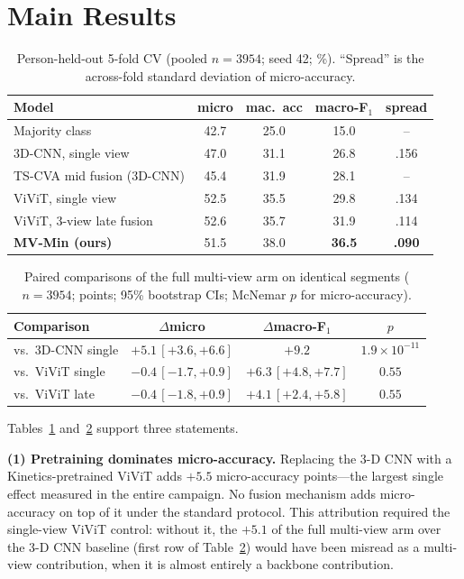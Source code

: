 \documentclass[journal]{IEEEtran}
\newcommand{\micro}{micro-accuracy}
\newcommand{\mF}{macro-F$_1$}
\newcommand{\mvmin}{MV-Min}
\begin{document}
\section{Main Results}
\label{sec:main}

\begin{table}[t]
\caption{Person-held-out 5-fold CV (pooled $n{=}3954$; seed 42; \%).
``Spread'' is the across-fold standard deviation of \micro.}
\label{tab:main}
\centering\footnotesize\setlength{\tabcolsep}{4pt}
\begin{tabular}{lcccc}
\toprule
Model & micro & mac.\ acc & \mF & spread \\
\midrule
Majority class            & 42.7 & 25.0 & 15.0 & --   \\
3D-CNN, single view       & 47.0 & 31.1 & 26.8 & .156 \\
TS-CVA mid fusion (3D-CNN)& 45.4 & 31.9 & 28.1 & --   \\
\midrule
ViViT, single view        & 52.5 & 35.5 & 29.8 & .134 \\
ViViT, 3-view late fusion & 52.6 & 35.7 & 31.9 & .114 \\
\textbf{\mvmin{} (ours)}  & 51.5 & 38.0 & \textbf{36.5} & \textbf{.090} \\
\bottomrule
\end{tabular}
\end{table}

\begin{table}[t]
\caption{Paired comparisons of the full multi-view arm on identical
segments ($n{=}3954$; points; 95\% bootstrap CIs; McNemar $p$ for \micro).}
\label{tab:paired}
\centering\footnotesize\setlength{\tabcolsep}{2.5pt}
\begin{tabular}{lccc}
\toprule
Comparison & $\Delta$micro & $\Delta$\mF & $p$ \\
\midrule
vs.\ 3D-CNN single & $+5.1\,[+3.6,+6.6]$ & $+9.2$ & $1.9{\times}10^{-11}$ \\
vs.\ ViViT single  & $-0.4\,[-1.7,+0.9]$ & $+6.3\,[+4.8,+7.7]$ & $0.55$ \\
vs.\ ViViT late    & $-0.4\,[-1.8,+0.9]$ & $+4.1\,[+2.4,+5.8]$ & $0.55$ \\
\bottomrule
\end{tabular}
\end{table}

Tables~\ref{tab:main} and~\ref{tab:paired} support three statements.

\textbf{(1) Pretraining dominates \micro.}  Replacing the 3-D CNN with a
Kinetics-pretrained ViViT adds $+5.5$ \micro{} points---the largest single
effect measured in the entire campaign.  No fusion mechanism adds \micro{}
on top of it under the standard protocol.  This attribution required the
single-view ViViT control: without it, the $+5.1$ of the full multi-view
arm over the 3-D CNN baseline (first row of Table~\ref{tab:paired}) would
have been misread as a multi-view contribution, when it is almost entirely
a backbone contribution.
\end{document}
